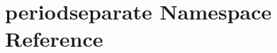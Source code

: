 \hypertarget{namespaceperiodseparate}{\section{periodseparate Namespace Reference}
\label{namespaceperiodseparate}
}
